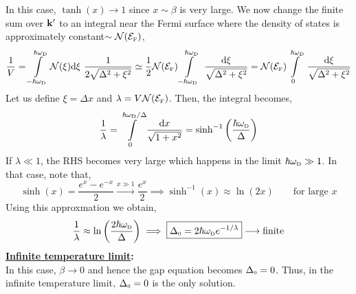\documentclass{article}
\newcommand{\tund}[1]{_{\text{\tiny #1}}}
\newcommand{\SE}{\mathcal{E}}
\newcommand{\vkd}{\vb{k}'}
\begin{document}
In this case, $\tanh(x)\to 1$ since $x\sim \beta$ is very large. We now change the finite sum over $\vkd$ to an integral near the Fermi surface where the density of states is approximately constant$\sim \mathcal{N}(\SE\tund{F})$,
\begin{equation}
    \frac{1}{V} = \int\limits_{-\hbar \omega\tund{D}}^{\hbar \omega\tund{D}}\mathcal{N}({\xi}) \dd \xi\ \frac{1}{2\sqrt{\Delta^2 + \xi^2}} \simeq \frac{1}{2}\mathcal{N}(\SE\tund{F})  \int\limits_{-\hbar \omega\tund{D}}^{\hbar \omega\tund{D}}\ \frac{\dd \xi}{\sqrt{\Delta^2 + \xi^2}} = \mathcal{N}(\SE\tund{F}) \int\limits_{0}^{\hbar \omega\tund{D}}\ \frac{\dd \xi}{\sqrt{\Delta^2 + \xi^2}}
\end{equation}
Let us define $\xi = \Delta x$ and $\lambda = V \mathcal{N}(\SE\tund{F})$. Then, the integral becomes,
\begin{equation}
    \frac{1}{\lambda} = \int\limits_{0}^{\hbar \omega\tund{D}/\Delta}\frac{\dd x}{\sqrt{1+x^2}}= \sinh^{-1}\qty(\frac{\hbar \omega\tund{D}}{\Delta})
\end{equation}
If $\lambda\ll 1$, the RHS becomes very large which happens in the limit $\hbar \omega\tund{D} \gg 1$. In that case, note that, 
\begin{equation}
    \sinh(x) = \frac{e^x-e^{-x}}{2}\xrightarrow{x\gg 1} \frac{e^x}{2}\implies \sinh^{-1}(x) \approx \ln(2x)\qquad \text{for large $x$}
\end{equation}
Using this approxmation we obtain,
\begin{equation}
    \frac{1}{\lambda} \approx \ln\qty(\frac{2\hbar \omega\tund{D}}{\Delta}) \implies \boxed{\Delta\tund{0} = 2\hbar \omega\tund{D} e^{-1/\lambda}}\longrightarrow \text{finite}
\end{equation}
\textbf{\underline{Infinite temperature limit}:}\\[0.2cm]
In this case, $\beta\to 0$ and hence the gap equation becomes $\Delta\tund{0} = 0$. Thus, in the infinite temperature limit, $\Delta\tund{0}=0$ is the only solution. 
\end{document}

